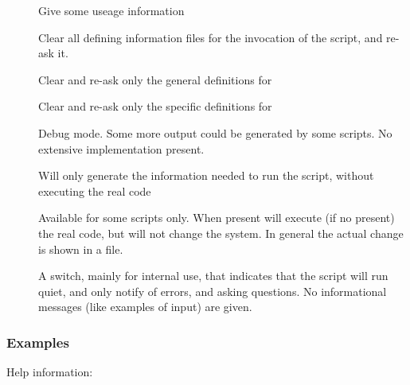 \begin{description}
\item[]
    Give some useage information
\item[]
    Clear all defining information files for the  invocation
    of the script, and re-ask it.
\item[]
    Clear and re-ask only the general definitions for 
\item[]
    Clear and re-ask only the specific definitions for 
\item[]
    Debug mode. Some more output could be generated by some scripts. No
    extensive implementation present.
\item[]
    Will only generate the information needed to run the script, without
    executing the real code
\item[]
    Available for some scripts only. When present will execute (if no
     present) the real code, but will not change the system. In
    general the actual change is shown in a  file.
\item[]
    A switch, mainly for internal use, that indicates that the script will
    run quiet, and only notify of errors, and asking questions. No
    informational messages (like examples of input) are given.
\end{description}

\subsubsection*{Examples}

\noindent
Help information:

